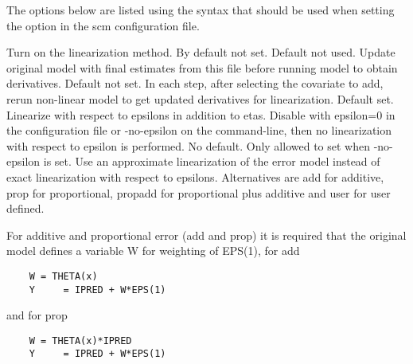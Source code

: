 The options below are listed using the syntax that should be used when setting the option in the scm configuration
file.
\begin{optionlist}
Turn on the linearization method. By default not set. 
\nextopt
{}
Default not used. Update original model with final estimates from this file before running model to obtain derivatives. 
\nextopt
{}
Default not set. In each step, after selecting the covariate to add, rerun non-linear model to get updated derivatives for linearization. 
\nextopt
{}
Default set. Linearize with respect to epsilons in addition to etas. Disable with epsilon=0 in the configuration file or -no-epsilon on the command-line, then no linearization with respect to epsilon is performed. 
\nextopt
{}
No default. Only allowed to set when -no-epsilon is set. Use an approximate linearization of the error model instead of exact linearization with respect to epsilons. Alternatives are add for additive, prop for proportional, propadd for proportional plus additive and user for user defined. 

For additive and proportional error (add and prop) it is required that the original model defines a variable W for weighting of EPS(1), for add
\begin{verbatim}
    W = THETA(x)
    Y     = IPRED + W*EPS(1)
\end{verbatim}
and for prop
\begin{verbatim}
    W = THETA(x)*IPRED
    Y     = IPRED + W*EPS(1)
\end{verbatim}


\end{optionlist}
